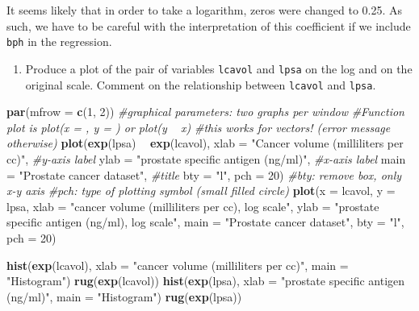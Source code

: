 \documentclass[]{book}
\newenvironment{Shaded}{\begin{snugshade}}{\end{snugshade}}
\newcommand{\CommentTok}[1]{\textcolor[rgb]{0.56,0.35,0.01}{\textit{#1}}}
\newcommand{\DataTypeTok}[1]{\textcolor[rgb]{0.13,0.29,0.53}{#1}}
\newcommand{\DecValTok}[1]{\textcolor[rgb]{0.00,0.00,0.81}{#1}}
\newcommand{\KeywordTok}[1]{\textcolor[rgb]{0.13,0.29,0.53}{\textbf{#1}}}
\newcommand{\NormalTok}[1]{#1}
\newcommand{\OperatorTok}[1]{\textcolor[rgb]{0.81,0.36,0.00}{\textbf{#1}}}
\newcommand{\StringTok}[1]{\textcolor[rgb]{0.31,0.60,0.02}{#1}}
\providecommand{\tightlist}{%
  \setlength{\itemsep}{0pt}\setlength{\parskip}{0pt}}
\theoremstyle{definition}
\theoremstyle{definition}
\theoremstyle{definition}
\theoremstyle{remark}
\begin{document}
It seems likely that in order to take a logarithm, zeros were changed to
0.25. As such, we have to be careful with the interpretation of this
coefficient if we include \texttt{bph} in the regression.

\begin{enumerate}
\def\labelenumi{\alph{enumi}.}
\setcounter{enumi}{1}
\tightlist
\item
  Produce a plot of the pair of variables \texttt{lcavol} and
  \texttt{lpsa} on the log and on the original scale. Comment on the
  relationship between \texttt{lcavol} and \texttt{lpsa}.
\end{enumerate}

\begin{Shaded}
\begin{Highlighting}[]
\KeywordTok{par}\NormalTok{(}\DataTypeTok{mfrow =} \KeywordTok{c}\NormalTok{(}\DecValTok{1}\NormalTok{, }\DecValTok{2}\NormalTok{)) }\CommentTok{#graphical parameters: two graphs per window}
\CommentTok{#Function plot is plot(x = , y = ) or plot(y ~ x)}
\CommentTok{#this works for vectors! (error message otherwise)}
\KeywordTok{plot}\NormalTok{(}\KeywordTok{exp}\NormalTok{(lpsa) }\OperatorTok{~}\StringTok{ }\KeywordTok{exp}\NormalTok{(lcavol),}
\DataTypeTok{xlab =} \StringTok{"Cancer volume (milliliters per cc)"}\NormalTok{, }\CommentTok{#y-axis label}
\DataTypeTok{ylab =} \StringTok{"prostate specific antigen (ng/ml)"}\NormalTok{, }\CommentTok{#x-axis label}
\DataTypeTok{main =} \StringTok{"Prostate cancer dataset"}\NormalTok{, }\CommentTok{#title}
\DataTypeTok{bty =} \StringTok{"l"}\NormalTok{, }\DataTypeTok{pch =} \DecValTok{20}\NormalTok{) }\CommentTok{#bty: remove box, only x-y axis}
\CommentTok{#pch: type of plotting symbol (small filled circle)}
\KeywordTok{plot}\NormalTok{(}\DataTypeTok{x =}\NormalTok{ lcavol, }\DataTypeTok{y =}\NormalTok{ lpsa,}
\DataTypeTok{xlab =} \StringTok{"cancer volume (milliliters per cc), log scale"}\NormalTok{,}
\DataTypeTok{ylab =} \StringTok{"prostate specific antigen (ng/ml), log scale"}\NormalTok{, }
\DataTypeTok{main =} \StringTok{"Prostate cancer dataset"}\NormalTok{,}
\DataTypeTok{bty =} \StringTok{"l"}\NormalTok{, }\DataTypeTok{pch =} \DecValTok{20}\NormalTok{)}

\KeywordTok{hist}\NormalTok{(}\KeywordTok{exp}\NormalTok{(lcavol), }\DataTypeTok{xlab =} \StringTok{"cancer volume (milliliters per cc)"}\NormalTok{, }\DataTypeTok{main =} \StringTok{"Histogram"}\NormalTok{)}
\KeywordTok{rug}\NormalTok{(}\KeywordTok{exp}\NormalTok{(lcavol))}
\KeywordTok{hist}\NormalTok{(}\KeywordTok{exp}\NormalTok{(lpsa), }\DataTypeTok{xlab =} \StringTok{"prostate specific antigen (ng/ml)"}\NormalTok{, }\DataTypeTok{main =} \StringTok{"Histogram"}\NormalTok{)}
\KeywordTok{rug}\NormalTok{(}\KeywordTok{exp}\NormalTok{(lpsa))}
\end{Highlighting}
\end{Shaded}
\end{document}
